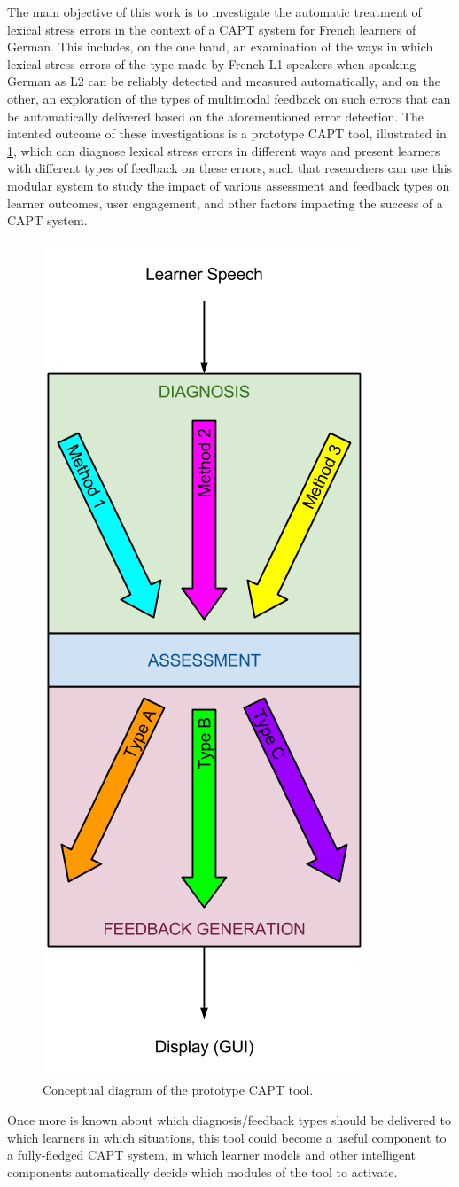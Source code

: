 The main objective of this work is to investigate the automatic treatment of lexical stress errors in the context of a CAPT system for French learners of German. This includes, on the one hand, an examination of the ways in which lexical stress errors of the type made by French L1 speakers when speaking German as L2 can be reliably detected and measured %
automatically, and on the other, an exploration of the types of multimodal feedback on such errors that can be automatically delivered based on the aforementioned error detection. 
The intented outcome of these investigations is a prototype CAPT tool, illustrated in \ref{fig:hourglass}, %
which can diagnose lexical stress errors in different ways and present learners with different types of feedback on these errors, such that researchers can use this modular system to study the impact of various assessment and feedback types on learner outcomes, user engagement, and other factors impacting the success of a CAPT system. 

		\begin{figure}[htb]
			\centering
			\includegraphics[width=.3\textwidth]{../img/hourglass}
			\caption{Conceptual diagram of the prototype CAPT tool.}
			\label{fig:hourglass}
		\end{figure}

Once more is known about which diagnosis/feedback types should be delivered to which learners in which situations, this tool could become a useful component to a fully-fledged CAPT system, in which learner models and other intelligent components automatically decide which modules of the tool to activate. %

